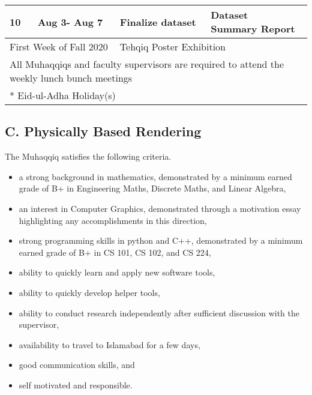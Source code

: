 \documentclass{article}
\begin{document}
\begin{tabularx}{\textwidth}{|*{2}{l|}X|l|}
  10                                           & Aug 3- Aug 7                                   & Finalize dataset                                                                & \shortstack[l]{Dataset   \\ Summary Report}\\\hline
  \multicolumn{2}{|l}{First Week of Fall 2020} & \multicolumn{2}{|l|}{Tehqiq Poster Exhibition}                                                                                                              \\\hline
  \multicolumn{4}{l}{\footnotesize * All Muhaqqiqs and faculty supervisors are required to attend the weekly lunch bunch meetings}                                                                           \\
  \multicolumn{4}{l}{\footnotesize ** Eid-ul-Adha Holiday(s)}
\end{tabularx}

\subsection*{C. Physically Based Rendering}

The Muhaqqiq satisfies the following criteria.
\begin{itemize}
  \item a strong background in mathematics, demonstrated by a minimum earned grade of B+ in Engineering Maths, Discrete Maths, and Linear Algebra,
  \item an interest in Computer Graphics, demonstrated through a motivation essay highlighting any accomplishments in this direction,
  \item strong programming skills in python and C++, demonstrated by a minimum earned grade of B+ in CS 101, CS 102, and CS 224,
  \item ability to quickly learn and apply new software tools,
  \item ability to quickly develop helper tools,
  \item ability to conduct research independently after sufficient discussion with the supervisor,
  \item availability to travel to Islamabad for a few days,
  \item good communication skills, and
  \item self motivated and responsible.
\end{itemize}
\end{document}
